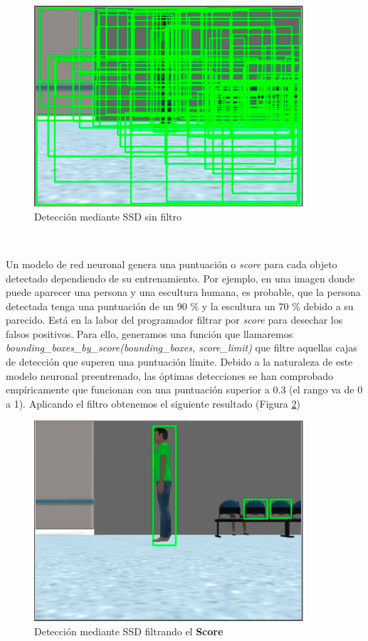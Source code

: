 \begin{figure} [H]
  \begin{center}
    \includegraphics[width=10cm]{imagenes/cap6/deteccion-ssd-sin-filtro.png}
  \end{center}
  \caption[Detección mediante SSD sin filtro]{Detección mediante SSD sin filtro}
  \label{fig:deteccion_ssd_sin_filtro}
\end{figure}\

Un modelo de red neuronal genera una puntuación o \textit{score} para cada objeto detectado dependiendo de su entrenamiento. Por ejemplo, en una imagen donde puede aparecer una persona y una escultura humana, es probable, que la persona detectada tenga una puntuación de un 90 \% y la escultura un 70 \% debido a su parecido. Está en la labor del programador filtrar por \textit{score} para desechar los falsos positivos. Para ello, generamos una función que llamaremos \textit{bounding\_boxes\_by\_score(bounding\_boxes, score\_limit)} que filtre aquellas cajas de detección que superen una puntuación límite. Debido a la naturaleza de este modelo neuronal preentrenado, las óptimas detecciones se han comprobado empíricamente que funcionan con una puntuación superior a 0.3 (el rango va de 0 a 1). Aplicando el filtro obtenemos el siguiente resultado (Figura \ref{fig:deteccion_ssd_filtro_score})\\

\begin{figure} [H]
  \begin{center}
    \includegraphics[width=10cm]{imagenes/cap6/deteccion-ssd-filtro-score.png}
  \end{center}
  \caption[Detección mediante SSD filtrando el \textbf{Score}]{Detección mediante SSD filtrando el \textbf{Score}}
  \label{fig:deteccion_ssd_filtro_score}
\end{figure}\

